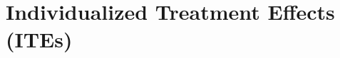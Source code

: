 











\FloatBarrier


\section{Individualized Treatment Effects (ITEs)} \label{sec:methods_ite}



% 
% 
% 
% 
% 
% 




